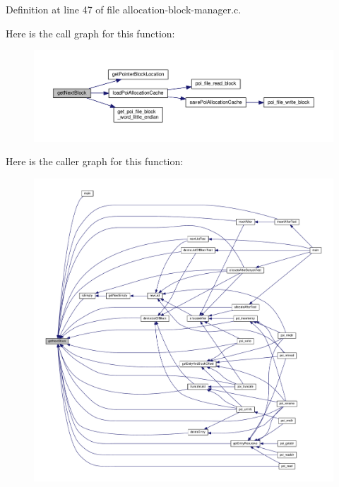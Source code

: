 Definition at line 47 of file allocation-\/block-\/manager.\-c.



Here is the call graph for this function\-:
\nopagebreak
\begin{figure}[H]
\begin{center}
\leavevmode
\includegraphics[width=350pt]{allocation-block-manager_8c_a0843a74a7e1cc7c50dbfa521e4ea1cc8_cgraph}
\end{center}
\end{figure}




Here is the caller graph for this function\-:
\nopagebreak
\begin{figure}[H]
\begin{center}
\leavevmode
\includegraphics[width=350pt]{allocation-block-manager_8c_a0843a74a7e1cc7c50dbfa521e4ea1cc8_icgraph}
\end{center}
\end{figure}


